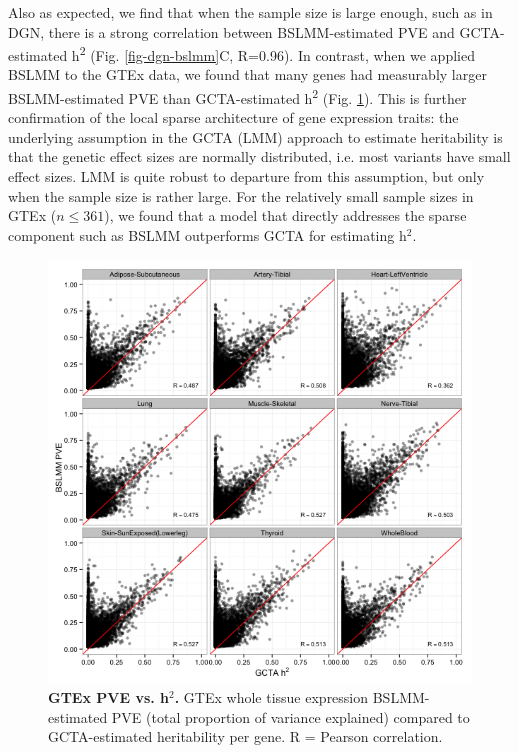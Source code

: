 \documentclass[10pt,letterpaper]{article}
\begin{document}
Also as expected, we find that when the sample size is large enough, such as in DGN, there is a strong correlation between BSLMM-estimated PVE and GCTA-estimated h\textsuperscript{2} (Fig. \ref{fig-dgn-bslmm}C, R=0.96). In contrast, when we applied BSLMM to the GTEx data, we found that many genes had measurably larger BSLMM-estimated PVE than GCTA-estimated h\textsuperscript{2} (Fig. \ref{fig-gtex-pve-h2}). This is further confirmation of the local sparse architecture of gene expression traits: the underlying assumption in the GCTA (LMM) approach to estimate heritability is that the genetic effect sizes are normally distributed, i.e. most variants have small effect sizes. LMM is quite robust to departure from this assumption, but only when the sample size is rather large. For the relatively small sample sizes in GTEx (\(n \leq 361\)), we found that a model that directly addresses the sparse component such as BSLMM outperforms GCTA for estimating h$^2$.

\begin{figure}[h]
\includegraphics[width=12cm]{Figures/Fig-GTEx_TW_PVE_v_h2.png}
\caption{{\bf GTEx PVE vs. h$^2$.} 
GTEx whole tissue expression BSLMM-estimated PVE (total proportion of variance 
explained) compared to GCTA-estimated heritability per gene. R = Pearson correlation.}
\label{fig-gtex-pve-h2}
\end{figure}
\end{document}
